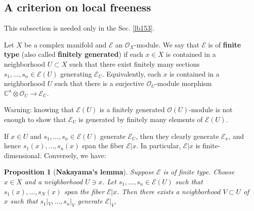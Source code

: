 \documentclass[11pt,b5paper,notitlepage]{article}
\theoremstyle{definition}
\theoremstyle{plain}
\newtheorem{pp}[df]{Proposition}
\newcommand{\scr}{\mathscr}
\newcommand{\Cbb}{\mathbb C}
\numberwithin{equation}{section}
\begin{document}
\subsection{A criterion on local freeness}

This subsection is needed only in the Sec. \ref{lb153}.

Let $X$ be a complex manifold and $\scr E$ an $\scr O_X$-module. We say that $\scr E$ is of \textbf{finite type} (also called \textbf{finitely generated}) if  each $x\in X$ is contained in a neighborhood $U\subset X$ such that there exist finitely many sections $s_1,\dots,s_n\in\scr E(U)$ generating $\scr E_U$. Equivalently, each $x$ is contained in a neighborhood $U$ such that there is a surjective $\scr O_U$-module morphism $\Cbb^n\otimes\scr O_U\rightarrow\scr E_U$.

Warning: knowing that $\scr E(U)$ is a finitely generated $\scr O(U)$-module is not enough to show that $\scr E_U$ is generated by finitely many elements of $\scr E(U)$.

If $x\in U$ and $s_1,\dots,s_n\in\scr E(U)$ generate $\scr E_U$, then they clearly generate $\scr E_x$, and hence $s_1(x),\dots,s_n(x)$ span the fiber $\scr E|x$. In particular, $\scr E|x$ is finite-dimensional. Conversely, we have:



\begin{pp}[\textbf{Nakayama's lemma}]
Suppose $\scr E$ is of finite type. Choose $x\in X$ and a neighborhood $U\ni x$. Let $s_1,\dots,s_n\in\scr E(U)$ such that $s_1(x),\dots,s_N(x)$ span the fiber $\scr E|x$. Then there exists a neighborhood $V\subset U$ of $x$ such that $s_1|_V,\dots,s_n|_V$ generate $\scr E|_V$.
\end{pp}
\end{document}
